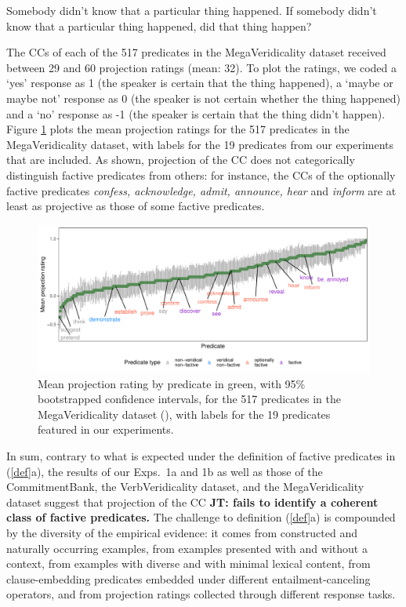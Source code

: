 \documentclass[11pt,fleqn]{article}
\newcommand{\6}{\mbox{$[\hspace*{-.6mm}[$}}
\newcommand{\9}{\mbox{$]\hspace*{-.6mm}]$}}
\newcommand{\jt}[1]{\textbf{\color{blue}JT: #1}}
\begin{document}
\begin{exe}
\ex\label{wr-stim-proj}
\begin{xlist}
\ex Somebody didn't know that a particular thing happened.
\ex If somebody didn't know that a particular thing happened, did that thing happen?
\end{xlist}
\end{exe}

The CCs of each of the 517 predicates in the MegaVeridicality dataset received between 29 and 60 projection ratings (mean: 32). To plot the ratings, we coded a `yes' response as 1 (the speaker is certain that the thing happened),  a `maybe or maybe not' response as 0 (the speaker is not certain whether the thing happened) and a `no' response as -1 (the speaker is certain that the thing didn't happen). Figure \ref{f-white-rawlins-projectivity} plots the mean projection ratings for the 517 predicates in the MegaVeridicality dataset, with labels for the 19 predicates from our experiments that are included. As shown, projection of the CC does not categorically distinguish factive predicates from others: for instance, the CCs of the optionally factive predicates {\em confess, acknowledge, admit, announce, hear} and {\em inform} are at least as projective as those of some factive predicates. 

\begin{figure}[H]
\centering
\includegraphics[width=.77\paperwidth]{../../MegaVeridicality-analysis/graphs/means-projection-by-predicate}

\caption{Mean projection rating by predicate in green, with 95\% bootstrapped confidence intervals, for the 517 predicates in the MegaVeridicality dataset (\citealt{white-rawlins-nels2018,white-etal2018b}), with labels for the 19 predicates featured in our experiments.}
\label{f-white-rawlins-projectivity}
\end{figure}


In sum, contrary to what is expected under the definition of factive predicates in (\ref{def}a), the results of our Exps.~1a and 1b as well as those of the CommitmentBank, the VerbVeridicality dataset, and the MegaVeridicality dataset suggest that projection of the CC \jt{fails to identify a coherent class of factive predicates.} The challenge to definition (\ref{def}a) is compounded by the diversity of the empirical evidence: it comes from constructed and naturally occurring examples, from examples presented with and without a context, from examples with diverse and with minimal lexical content, from clause-embedding predicates embedded under different entailment-canceling operators, and from projection ratings collected through different response tasks. 
\end{document}
